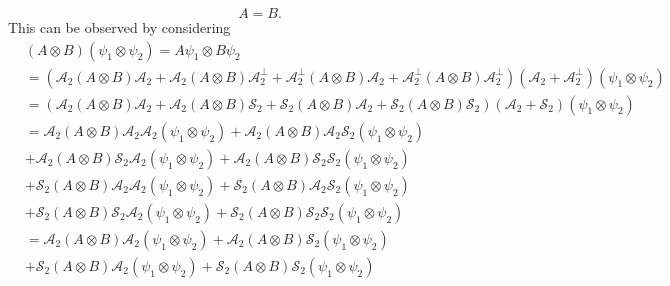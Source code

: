 \documentclass[aps, preprint]{revtex4}
\begin{document}
\begin{equation}A =B\text{.}
\end{equation}This can be observed by considering
\begin{align} & \left (A \otimes B\right ) \left (\psi _{1} \otimes \psi _{2}\right ) =A \psi _{1} \otimes B \psi _{2} \\
 &  =\left (\mathcal{A}_{2} \left (A \otimes B\right ) \mathcal{A}_{2} +\mathcal{A}_{2} \left (A \otimes B\right ) \mathcal{A}_{2}^{\bot } +\mathcal{A}_{2}^{\bot } \left (A \otimes B\right ) \mathcal{A}_{2} +\mathcal{A}_{2}^{\bot } \left (A \otimes B\right ) \mathcal{A}_{2}^{\bot }\right ) \left (\mathcal{A}_{2} +\mathcal{A}_{2}^{\bot }\right ) \left (\psi _{1} \otimes \psi _{2}\right ) \\
 &  =\left (\mathcal{A}_{2} \left (A \otimes B\right ) \mathcal{A}_{2} +\mathcal{A}_{2} \left (A \otimes B\right ) \mathcal{S}_{2} +\mathcal{S}_{2} \left (A \otimes B\right ) \mathcal{A}_{2} +\mathcal{S}_{2} \left (A \otimes B\right ) \mathcal{S}_{2}\right ) \left (\mathcal{A}_{2} +\mathcal{S}_{2}\right ) \left (\psi _{1} \otimes \psi _{2}\right ) \\
 &  =\mathcal{A}_{2} \left (A \otimes B\right ) \mathcal{A}_{2} \mathcal{A}_{2} \left (\psi _{1} \otimes \psi _{2}\right ) +\mathcal{A}_{2} \left (A \otimes B\right ) \mathcal{A}_{2} \mathcal{S}_{2} \left (\psi _{1} \otimes \psi _{2}\right ) \\
 &  +\mathcal{A}_{2} \left (A \otimes B\right ) \mathcal{S}_{2} \mathcal{A}_{2} \left (\psi _{1} \otimes \psi _{2}\right ) +\mathcal{A}_{2} \left (A \otimes B\right ) \mathcal{S}_{2} \mathcal{S}_{2} \left (\psi _{1} \otimes \psi _{2}\right ) \\
 &  +\mathcal{S}_{2} \left (A \otimes B\right ) \mathcal{A}_{2} \mathcal{A}_{2} \left (\psi _{1} \otimes \psi _{2}\right ) +\mathcal{S}_{2} \left (A \otimes B\right ) \mathcal{A}_{2} \mathcal{S}_{2} \left (\psi _{1} \otimes \psi _{2}\right ) \\
 &  +\mathcal{S}_{2} \left (A \otimes B\right ) \mathcal{S}_{2} \mathcal{A}_{2} \left (\psi _{1} \otimes \psi _{2}\right ) +\mathcal{S}_{2} \left (A \otimes B\right ) \mathcal{S}_{2} \mathcal{S}_{2} \left (\psi _{1} \otimes \psi _{2}\right ) \\
 &  =\mathcal{A}_{2} \left (A \otimes B\right ) \mathcal{A}_{2} \left (\psi _{1} \otimes \psi _{2}\right ) +\mathcal{A}_{2} \left (A \otimes B\right ) \mathcal{S}_{2} \left (\psi _{1} \otimes \psi _{2}\right ) \\
 &  +\mathcal{S}_{2} \left (A \otimes B\right ) \mathcal{A}_{2} \left (\psi _{1} \otimes \psi _{2}\right ) +\mathcal{S}_{2} \left (A \otimes B\right ) \mathcal{S}_{2} \left (\psi _{1} \otimes \psi _{2}\right )\end{align}
\end{document}
